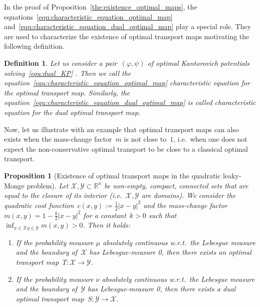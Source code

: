 \documentclass{article}
\newtheorem{definition}[theorem]{Definition}
\newtheorem{proposition}[theorem]{Proposition}
\theoremstyle{definition}
\begin{document}
In the proof of Proposition~\ref{the:existence_optimal_maps}, the equations~\eqref{equ:characteristic_equation_optimal_map} and~\eqref{equ:characteristic_equation_dual_optimal_map} play a special role. They are used to characterize the existence of optimal transport maps motivating the following definition. 
\begin{definition}
     Let us consider a pair~$(\varphi, \psi)$ of optimal Kantorovich potentials solving~\eqref{equ:dual_KP} . Then we call the equation~\eqref{equ:characteristic_equation_optimal_map} characteristic equation for the optimal transport map. Similarly, the equation~\eqref{equ:characteristic_equation_dual_optimal_map} is called characteristic equation for the dual optimal transport map. 
\end{definition}


Now, let us illustrate with an example that optimal transport maps can also exists when the mass-change factor~$m$ is not close to~$1$, i.e.~when one does not expect the non-conservative optimal transport to be close to a classical optimal transport. 

\begin{proposition}[Existence of optimal transport maps in the quadratic leaky-Monge problem]\label{the:solution_quadratic_leaky_monge}
     Let $\mathcal{X}, \mathcal{Y} \subset \mathbb{R}^n$ be non-empty, compact, connected sets that are equal to the closure of its interior (i.e.~$\mathcal{X}, \mathcal{Y}$ are domains). We consider the quadratic cost function~$c(x,y):= \frac{1}{2} |x-y|^2$ and the mass-change factor~$m(x,y)= 1- \frac{k}{2}|x-y|^2$ for a constant~$k>0$ such that~$\inf_{x \in \mathcal{X} y \in \mathcal{Y}} m (x,y) > 0$. Then it holds:
    \begin{enumerate}[label=(\roman*)]
        \item If the probability measure $\mu$ absolutely continuous w.r.t.~the Lebesgue measure and the boundary of~$\mathcal{X}$ has Lebesgue-measure 0, then there exists an optimal transport map~$T: \mathcal{X} \to \mathcal{Y}$.
        \item If the probability measure $\nu$ absolutely continuous w.r.t.~the Lebesgue measure and the boundary of~$\mathcal{Y}$ has Lebesgue-measure 0, then there exists a dual optimal transport map~$S: \mathcal{Y} \to \mathcal{X}$.
    \end{enumerate}
\end{proposition}
\end{document}
